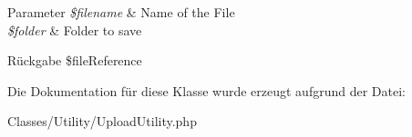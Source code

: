 \begin{DoxyParams}{Parameter}
{\em \$filename} & Name of the File \\
\hline
{\em \$folder} & Folder to save \\
\hline
\end{DoxyParams}
\begin{DoxyReturn}{Rückgabe}
\$file\+Reference 
\end{DoxyReturn}


Die Dokumentation für diese Klasse wurde erzeugt aufgrund der Datei\+:\begin{DoxyCompactItemize}
\item 
Classes/\+Utility/Upload\+Utility.\+php\end{DoxyCompactItemize}
